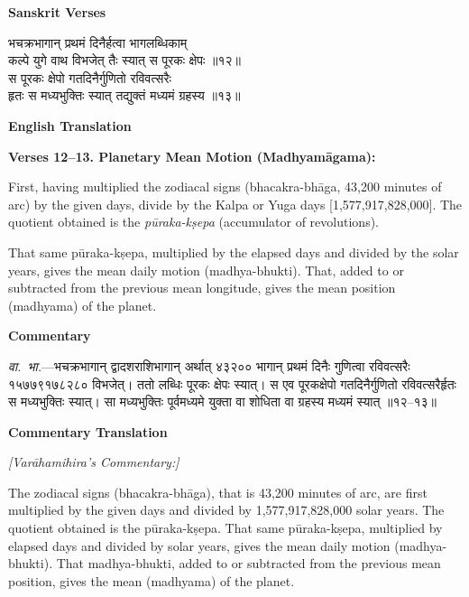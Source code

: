 \documentclass[11pt,a4paper]{article}
\begin{document}
\begin{minipage}[t]{0.48\textwidth}
\textbf{\small Sanskrit Verses}

\small\devanagarifont
भचक्रभागान् प्रथमं दिनैर्हत्वा भागलब्धिकाम्\\
कल्पे युगे वाथ विभजेत् तैः स्यात् स पूरकः क्षेपः ॥१२॥\\[0.5em]
स पूरकः क्षेपो गतदिनैर्गुणितो रविवत्सरैः\\
हृतः स मध्यभुक्तिः स्यात् तद्युक्तं मध्यमं ग्रहस्य ॥१३॥
\end{minipage}%
\hfill
\begin{minipage}[t]{0.48\textwidth}
\textbf{\small English Translation}

\textbf{Verses 12--13. Planetary Mean Motion (Madhyam\=agama):}

First, having multiplied the zodiacal signs (bhacakra-bh\=aga, 43,200 minutes of arc) by the given days, divide by the Kalpa or Yuga days [1,577,917,828,000]. The quotient obtained is the \textit{p\=uraka-k\d{s}epa} (accumulator of revolutions).

That same p\=uraka-k\d{s}epa, multiplied by the elapsed days and divided by the solar years, gives the mean daily motion (madhya-bhukti). That, added to or subtracted from the previous mean longitude, gives the mean position (madhyama) of the planet.
\end{minipage}

\vspace{0.5em}
\begin{minipage}[t]{0.48\textwidth}
\textbf{\small Commentary}

\small\devanagarifont
\textit{वा.~भा.}---भचक्रभागान् द्वादशराशिभागान् अर्थात् ४३२०० भागान् प्रथमं दिनैः गुणित्वा रविवत्सरैः १५७७९१७८२८० विभजेत्। ततो लब्धिः पूरकः क्षेपः स्यात्। स एव पूरकक्षेपो गतदिनैर्गुणितो रविवत्सरैर्हृतः स मध्यभुक्तिः स्यात्। सा मध्यभुक्तिः पूर्वमध्यमे युक्ता वा शोधिता वा ग्रहस्य मध्यमं स्यात् ॥१२--१३॥
\end{minipage}%
\hfill
\begin{minipage}[t]{0.48\textwidth}
\textbf{\small Commentary Translation}

\textit{[Var\=ahamihira's Commentary:]}

The zodiacal signs (bhacakra-bh\=aga), that is 43,200 minutes of arc, are first multiplied by the given days and divided by 1,577,917,828,000 solar years. The quotient obtained is the p\=uraka-k\d{s}epa. That same p\=uraka-k\d{s}epa, multiplied by elapsed days and divided by solar years, gives the mean daily motion (madhya-bhukti). That madhya-bhukti, added to or subtracted from the previous mean position, gives the mean (madhyama) of the planet.
\end{minipage}
\end{document}
